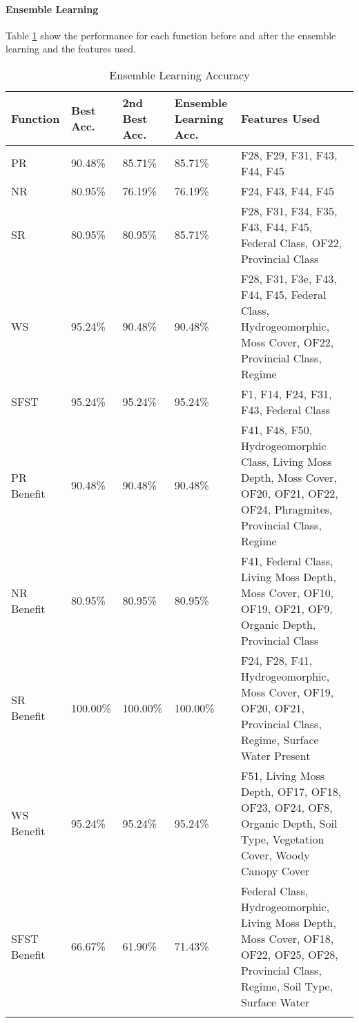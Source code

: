 \documentclass[12pt,letterpaper]{article}
\begin{document}
\paragraph{Ensemble Learning}
Table \ref{tab_class_specxtra:ensemble_reduction} show the performance for each function before and after the ensemble learning and the features used.

\begin{longtable}{|p{2cm}|p{2cm}|p{2cm}|p{2cm}|p{6cm}|}
\hline
\textbf{Function} & \textbf{Best Acc.} & \textbf{2nd Best Acc.} & \textbf{Ensemble Learning Acc.} & \textbf{Features Used} \\ \hline
PR & 90.48\% & 85.71\% & 85.71\% & F28, F29, F31, F43, F44, F45 \\ \hline
NR & 80.95\% & 76.19\% & 76.19\% & F24, F43, F44, F45 \\ \hline
SR & 80.95\% & 80.95\% & 85.71\% & F28, F31, F34, F35, F43, F44, F45, Federal Class, OF22, Provincial Class \\ \hline
WS & 95.24\% & 90.48\% & 90.48\% & F28, F31, F3e, F43, F44, F45, Federal Class, Hydrogeomorphic, Moss Cover, OF22, Provincial Class, Regime \\ \hline
SFST & 95.24\% & 95.24\% & 95.24\% & F1, F14, F24, F31, F43, Federal Class \\ \hline
PR Benefit & 90.48\% & 90.48\% & 90.48\% & F41, F48, F50, Hydrogeomorphic Class, Living Moss Depth, Moss Cover, OF20, OF21, OF22, OF24, Phragmites, Provincial Class, Regime \\ \hline
NR Benefit & 80.95\% & 80.95\% & 80.95\% & F41, Federal Class, Living Moss Depth, Moss Cover, OF10, OF19, OF21, OF9, Organic Depth, Provincial Class \\ \hline
SR Benefit & 100.00\% & 100.00\% & 100.00\% & F24, F28, F41, Hydrogeomorphic, Moss Cover, OF19, OF20, OF21, Provincial Class, Regime, Surface Water Present \\ \hline
WS Benefit & 95.24\% & 95.24\% & 95.24\% & F51, Living Moss Depth, OF17, OF18, OF23, OF24, OF8, Organic Depth, Soil Type, Vegetation Cover, Woody Canopy Cover \\ \hline
SFST Benefit & 66.67\% & 61.90\% & 71.43\% & Federal Class, Hydrogeomorphic, Living Moss Depth, Moss Cover, OF18, OF22, OF25, OF28, Provincial Class, Regime, Soil Type, Surface Water \\ \hline
\caption{Ensemble Learning Accuracy}
\label{tab_class_specxtra:ensemble_reduction}
\end{longtable}
\end{document}
